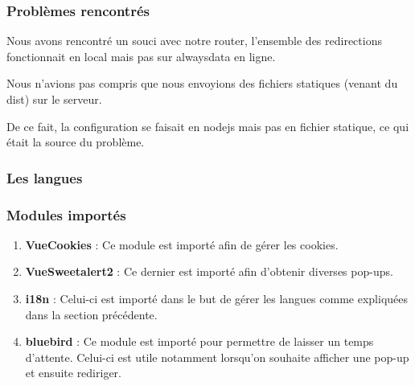 \subsubsection{Problèmes rencontrés}
\begin{flushleft}
Nous avons rencontré un souci avec notre router, l’ensemble des redirections fonctionnait en local mais pas sur alwaysdata en ligne.
\end{flushleft}
\begin{flushleft}
Nous n’avions pas compris que nous envoyions des fichiers statiques (venant du dist) sur le serveur.
\end{flushleft}
\begin{flushleft}
De ce fait, la configuration se faisait en nodejs mais pas en fichier statique, ce qui était la source du problème.
\end{flushleft}

\subsubsection{Les langues}

\subsubsection{Modules importés}
\begin{enumerate}[-]
\item \textbf{VueCookies} :\newline
Ce module est importé afin de gérer les cookies.
\item \textbf{VueSweetalert2} :\newline
Ce dernier est importé afin d'obtenir diverses pop-ups.
\item \textbf{i18n} :\newline
Celui-ci est importé dans le but de gérer les langues comme expliquées dans la section précédente.
\item \textbf{bluebird} :\newline
Ce module est importé pour permettre de laisser un temps d'attente.\newline
Celui-ci est utile notamment lorsqu'on souhaite afficher une pop-up et ensuite rediriger.
\end{enumerate} 
